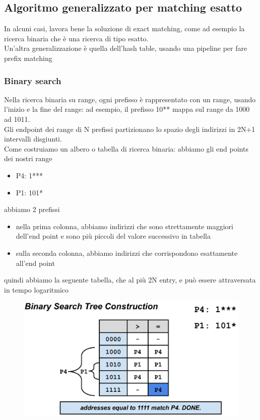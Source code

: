 \documentclass[12pt, oneside]{extbook} %
\begin{document}
\subsection{Algoritmo generalizzato per matching esatto}
In alcuni casi, lavora bene la soluzione di exact matching, come ad esempio la ricerca binaria che è una ricerca di tipo esatto.
\\Un'altra generalizzazione è quella dell'hash table, usando una pipeline per fare prefix matching

\subsubsection{Binary search}
Nella ricerca binaria su range, ogni prefisso è rappresentato con un range, usando l'inizio e la fine del range: ad esempio, il prefisso 10** mappa sul range da 1000 ad 1011.
\\Gli endpoint dei range di N prefissi partizionano lo spazio degli indirizzi in 2N+1 intervalli disgiunti.
\\Come costruiamo un albero o tabella di ricerca binaria: abbiamo gli end points dei nostri range
\begin{itemize}
\item P4: 1***
\item P1: 101*
\end{itemize}
abbiamo 2 prefissi
\begin{itemize}
\item nella prima colonna, abbiamo indirizzi che sono strettamente maggiori dell'end point e sono più piccoli del valore successivo in tabella
\item sulla seconda colonna, abbiamo indirizzi che corrispondono esattamente all'end point
\end{itemize}
quindi abbiamo la seguente tabella, che al più 2N entry, e può essere attraversata in tempo logaritmico\\
\begin{figure}[h!]
    \centering
    \includegraphics[scale=0.5]{../../immagini/bst}
\end{figure}
\end{document}
